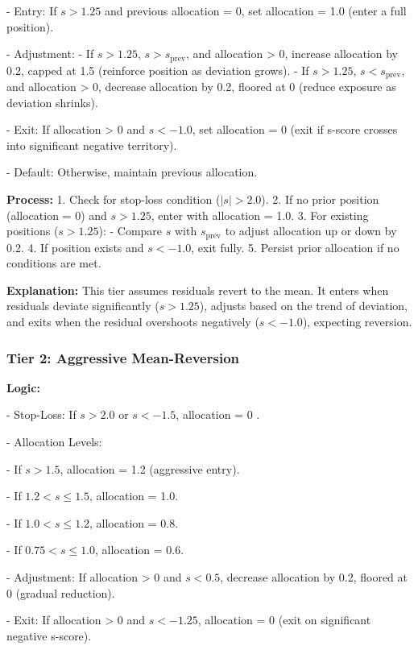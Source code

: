 \documentclass[a4paper,12pt]{article}
\begin{document}
- Entry: If \(s > 1.25\) and previous allocation = 0, set allocation = 1.0 (enter a full position).

- Adjustment:
  - If \(s > 1.25\), \(s > s_{\text{prev}}\), and allocation > 0, increase allocation by 0.2, capped at 1.5 (reinforce position as deviation grows).
  - If \(s > 1.25\), \(s < s_{\text{prev}}\), and allocation > 0, decrease allocation by 0.2, floored at 0 (reduce exposure as deviation shrinks).
  
- Exit: If allocation > 0 and \(s < -1.0\), set allocation = 0 (exit if s-score crosses into significant negative territory).

- Default: Otherwise, maintain previous allocation.

\textbf{Process:}
1. Check for stop-loss condition (\(|s| > 2.0\)).
2. If no prior position (allocation = 0) and \(s > 1.25\), enter with allocation = 1.0.
3. For existing positions (\(s > 1.25\)):
   - Compare \(s\) with \(s_{\text{prev}}\) to adjust allocation up or down by 0.2.
4. If position exists and \(s < -1.0\), exit fully.
5. Persist prior allocation if no conditions are met.

\textbf{Explanation:} This tier assumes residuals revert to the mean. It enters when residuals deviate significantly (\(s > 1.25\)), adjusts based on the trend of deviation, and exits when the residual overshoots negatively (\(s < -1.0\)), expecting reversion.

\subsubsection{Tier 2: Aggressive Mean-Reversion}

\textbf{Logic:}

- Stop-Loss: If \(s > 2.0\) or \(s < -1.5\), allocation = 0 .

- Allocation Levels:

  - If \(s > 1.5\), allocation = 1.2 (aggressive entry).
  
  - If \(1.2 < s \leq 1.5\), allocation = 1.0.
  
  - If \(1.0 < s \leq 1.2\), allocation = 0.8.
  
  - If \(0.75 < s \leq 1.0\), allocation = 0.6.
  
- Adjustment: If allocation > 0 and \(s < 0.5\), decrease allocation by 0.2, floored at 0 (gradual reduction).

- Exit: If allocation > 0 and \(s < -1.25\), allocation = 0 (exit on significant negative s-score).
\end{document}
